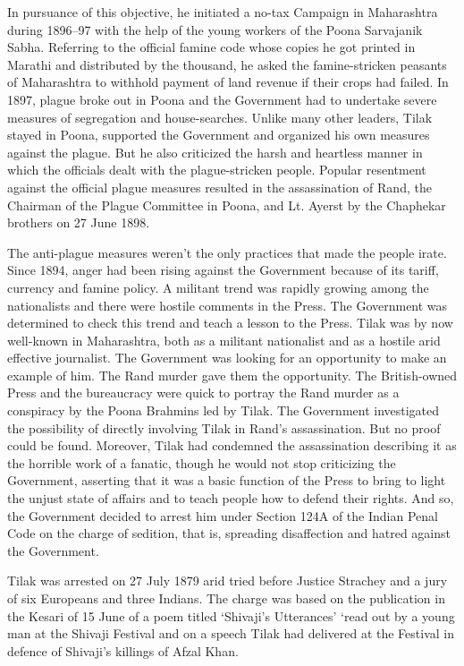 In pursuance of this objective, he initiated a no-tax Campaign in Maharashtra during 1896--97 with the help of the young workers of the Poona Sarvajanik Sabha. Referring to the official famine code whose copies he got printed in Marathi and distributed by the thousand, he asked the famine-stricken peasants of Maharashtra to withhold payment of land revenue if their crops had failed. In 1897, plague broke out in Poona and the Government had to undertake severe measures of segregation and house-searches. Unlike many other leaders, Tilak stayed in Poona, supported the Government and organized his own measures against the plague. But he also criticized the harsh and heartless manner in which the officials dealt with the plague-stricken people. Popular resentment against the official plague measures resulted in the assassination of Rand, the Chairman of the Plague Committee in Poona, and Lt. Ayerst by the Chaphekar brothers on 27 June 1898.

The anti-plague measures weren't the only practices that made the people irate. Since 1894, anger had been rising against the Government because of its tariff, currency and famine policy. A militant trend was rapidly growing among the nationalists and there were hostile comments in the Press. The Government was determined to check this trend and teach a lesson to the Press. Tilak was by now well-known in Maharashtra, both as a militant nationalist and as a hostile arid effective journalist. The Government was looking for an opportunity to make an example of him. The Rand murder gave them the opportunity. The British-owned Press and the bureaucracy were quick to portray the Rand murder as a conspiracy by the Poona Brahmins led by Tilak. The Government investigated the possibility of directly involving Tilak in Rand's assassination. But no proof could be found. Moreover, Tilak had condemned the assassination describing it as the horrible work of a fanatic, though he would not stop criticizing the Government, asserting that it was a basic function of the Press to bring to light the unjust state of affairs and to teach people how to defend their rights. And so, the Government decided to arrest him under Section 124A of the Indian Penal Code on the charge of sedition, that is, spreading disaffection and hatred against the Government.

Tilak was arrested on 27 July 1879 arid tried before Justice Strachey and a jury of six Europeans and three Indians. The charge was based on the publication in the Kesari of 15 June of a poem titled `Shivaji's Utterances' `read out by a young man at the Shivaji Festival and on a speech Tilak had delivered at the Festival in defence of Shivaji's killings of Afzal Khan.

